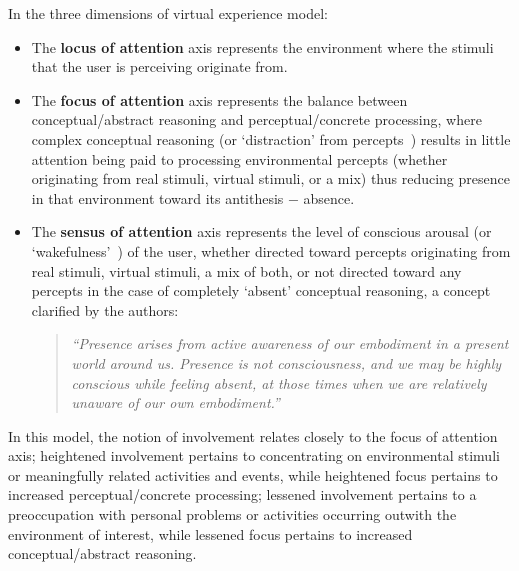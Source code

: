 In the three dimensions of virtual experience model:
\begin{itemize}
	\item The \textbf{locus of attention} axis represents the environment where the stimuli that the user is perceiving originate from.
	\item The \textbf{focus of attention} axis represents the balance between conceptual/abstract reasoning and perceptual/concrete processing, where complex conceptual reasoning (or `distraction' from percepts~\cite{Chalmers2014}) results in little attention being paid to processing environmental percepts (whether originating from real stimuli, virtual stimuli, or a mix) thus reducing presence\presencefootnote{} in that environment toward its antithesis $-$ absence\absencefootnote{}.
	\item The \textbf{sensus of attention} axis represents the level of conscious arousal (or `wakefulness'~\cite{Laureys2009}) of the user, whether directed toward percepts originating from real stimuli, virtual stimuli, a mix of both, or not directed toward any percepts in the case of completely `absent' conceptual reasoning, a concept clarified by the authors:

\begin{quote}
	\textit{``Presence arises from active awareness of our embodiment in a present world around us. Presence is not consciousness, and we may be highly conscious while feeling absent, at those times when we are relatively unaware of our own embodiment.''}~\cite{Waterworth2014}
\end{quote}
\end{itemize}

In this model, the notion of involvement relates closely to the focus of attention axis; heightened involvement pertains to concentrating on environmental stimuli or meaningfully related activities and events, while heightened focus pertains to increased perceptual/concrete processing; lessened involvement pertains to a preoccupation with personal problems or activities occurring outwith the environment of interest, while lessened focus pertains to increased conceptual/abstract reasoning.


